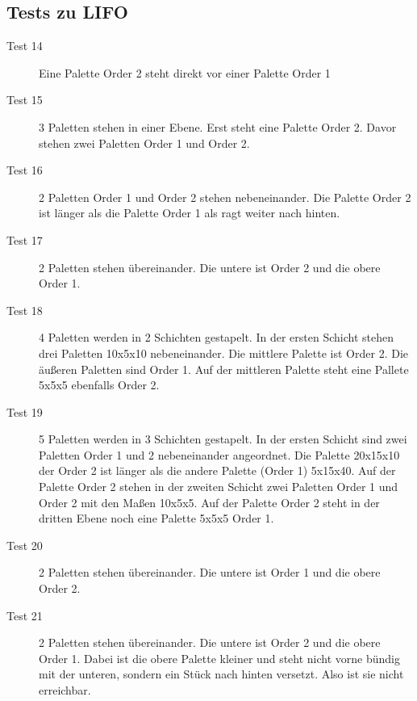\documentclass{scrartcl}
\newcommand{\cmark}{\ding{51}}%
\newcommand{\xmark}{\ding{55}}%
\begin{document}
\subsection*{Tests zu LIFO}
	\begin{description}
	\item[Test 14 \xmark] Eine Palette Order 2 steht direkt vor einer Palette Order 1
	\item[Test 15 \cmark] 3 Paletten stehen in einer Ebene. Erst steht eine Palette Order 2. Davor stehen zwei Paletten Order 1 und Order 2.
	\item[Test 16 \cmark] 2 Paletten Order 1 und Order 2 stehen nebeneinander. Die Palette Order 2 ist länger als die Palette Order 1 als ragt weiter nach hinten.
	\item[Test 17 \cmark] 2 Paletten stehen übereinander. Die untere ist Order 2 und die obere Order 1.
	\item[Test 18 \cmark] 4 Paletten werden in 2 Schichten gestapelt. In der ersten Schicht stehen drei Paletten 10x5x10 nebeneinander. Die mittlere Palette ist Order 2. Die äußeren Paletten sind Order 1. Auf der mittleren Palette steht eine Pallete 5x5x5 ebenfalls Order 2.
	\item[Test 19 \cmark] 5 Paletten werden in 3 Schichten gestapelt. In der ersten Schicht sind zwei Paletten Order 1 und 2 nebeneinander angeordnet. Die Palette 20x15x10 der Order 2 ist länger als die andere Palette (Order 1) 5x15x40. Auf der Palette Order 2 stehen in der zweiten Schicht zwei Paletten Order 1 und Order 2 mit den Maßen 10x5x5. Auf der Palette Order 2 steht in der dritten Ebene noch eine Palette 5x5x5 Order 1.
	\item[Test 20 \xmark] 2 Paletten stehen übereinander. Die untere ist Order 1 und die obere Order 2.
	\item[Test 21 \xmark] 2 Paletten stehen übereinander. Die untere ist Order 2 und die obere Order 1. Dabei ist die obere Palette kleiner und steht nicht vorne bündig mit der unteren, sondern ein Stück nach hinten versetzt. Also ist sie nicht erreichbar.
\end{description}
\end{document}
